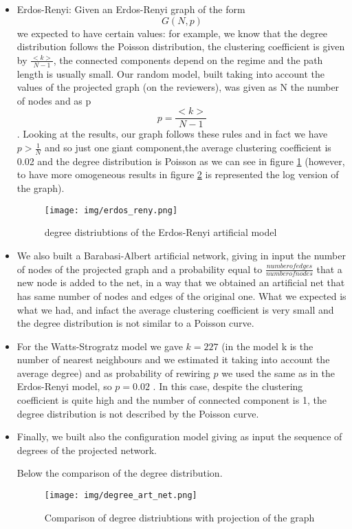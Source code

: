 \documentclass[sigchi]{acmart}
\begin{document}
\begin{itemize}
    

\item Erdos-Renyi: Given an Erdos-Renyi graph of the form \[G(N,p)\] we expected to have certain values: for example, we know that the degree distribution follows the Poisson distribution, the clustering coefficient is given by $\frac{<k>}{N-1}$, the connected components depend on the regime and the path length is usually small. Our random model,  built taking into account the values of the projected graph (on the reviewers), was given as N the number of nodes and as p \[p= \frac{<k>}{N-1}\]. Looking at the results, our graph follows these rules and in fact we have $p> \frac{1}{N}$ and so just one giant component,the average clustering coefficient is 0.02 and the degree distribution is Poisson as we can see in figure \ref{dd_er} (however, to have more omogeneous results in figure \ref{proj_dd_comp} is represented the log version of the graph). \newline
\begin{figure}[h]
  \centering
  \texttt{[image: img/erdos\_reny.png]}
  \caption{degree distriubtions of the Erdos-Renyi artificial model}
  \label{dd_er}
\end{figure}
\item We also built a Barabasi-Albert artificial network, giving in input the number of nodes of the projected graph and a probability equal to $ \frac{number of edges}{number of nodes}$ that a new node is added to the net, in a way that we obtained an artificial net that has same number of nodes and edges of the original one. What we expected is what we had, and infact the average clustering coefficient is very small and the degree distribution is not similar to a Poisson curve. 
\item For the Watts-Strogratz model we gave $k= 227$ (in the model k is the number of nearest neighbours and we estimated it taking into account the average degree) and as probability of rewiring $p$ we used the same as in the Erdos-Renyi model, so $p= 0.02$ . In this case, despite the clustering coefficient is quite high and the number of connected component is 1, the degree distribution is not described by the Poisson curve. 
\item Finally, we built also the configuration model giving as input the sequence of degrees of the projected network. 

Below the comparison of the degree distribution.
\begin{figure}[h]
  \centering
  \texttt{[image: img/degree\_art\_net.png]}
  \caption{Comparison of degree distriubtions with projection of the graph}
  \label{proj_dd_comp}
\end{figure}
\end{itemize}
\end{document}
